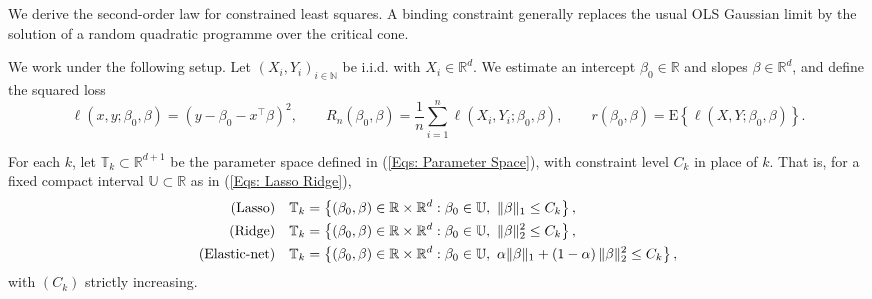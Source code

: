 \documentclass[12pt]{article}
\theoremstyle{remark}
\theoremstyle{plain}
\begin{document}
We derive the second-order law for constrained least squares. A binding constraint generally replaces the usual OLS Gaussian limit by the solution of a random quadratic programme over the critical cone.

We work under the following setup. Let $(X_{i},Y_{i})_{i\in\mathbb{N}}$
be i.i.d. with $X_{i}\in\mathbb{R}^{d}$. We estimate an intercept
$\beta_{0}\in\mathbb{R}$ and slopes $\beta\in\mathbb{R}^{d}$, and
define the squared loss
\[
\ell(x,y;\beta_{0},\beta)=\left(y-\beta_{0}-x^{\top}\beta\right)^{2},\qquad R_{n}(\beta_{0},\beta)=\frac{1}{n}\sum_{i=1}^{n}\ell(X_{i},Y_{i};\beta_{0},\beta),\qquad r(\beta_{0},\beta)=\mathrm{E}\left\{ \ell(X,Y;\beta_{0},\beta)\right\} .
\]

For each $k$, let $\mathbb{T}_{k}\subset\mathbb{R}^{d+1}$ be the
parameter space defined in (\ref{Eqs: Parameter Space}), with constraint
level $C_{k}$ in place of $k$. That is, for a fixed compact interval
$\mathbb{U}\subset\mathbb{R}$ as in (\ref{Eqs: Lasso Ridge}),
\begin{align*}
\textnormal{(Lasso)}\quad & \mathbb{T}_{k}=\left\{ (\beta_{0},\beta)\in\mathbb{R}\times\mathbb{R}^{d}:\beta_{0}\in\mathbb{U},\ \lVert\beta\rVert_{1}\le C_{k}\right\} ,\\
\textnormal{(Ridge)}\quad & \mathbb{T}_{k}=\left\{ (\beta_{0},\beta)\in\mathbb{R}\times\mathbb{R}^{d}:\beta_{0}\in\mathbb{U},\ \lVert\beta\rVert_{2}^{2}\le C_{k}\right\} ,\\
\textnormal{(Elastic-net)}\quad & \mathbb{T}_{k}=\left\{ (\beta_{0},\beta)\in\mathbb{R}\times\mathbb{R}^{d}:\beta_{0}\in\mathbb{U},\ \alpha\lVert\beta\rVert_{1}+\left(1-\alpha\right)\lVert\beta\rVert_{2}^{2}\le C_{k}\right\} ,
\end{align*}
with $(C_{k})$ strictly increasing.
\end{document}
